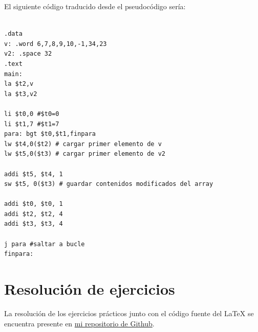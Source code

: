 \documentclass[11pt]{article}
\begin{document}
\begin{large}
\begin{flushleft}
El siguiente código traducido desde el pseudocódigo sería:
\newpage

\begin{listing}[h]
\begin{verbatim}

.data
v: .word 6,7,8,9,10,-1,34,23
v2: .space 32
.text
main: 
la $t2,v
la $t3,v2

li $t0,0 #$t0=0
li $t1,7 #$t1=7
para: bgt $t0,$t1,finpara
lw $t4,0($t2) # cargar primer elemento de v
lw $t5,0($t3) # cargar primer elemento de v2

addi $t5, $t4, 1
sw $t5, 0($t3) # guardar contenidos modificados del array

addi $t0, $t0, 1
addi $t2, $t2, 4
addi $t3, $t3, 4

j para #saltar a bucle
finpara: 

\end{verbatim}
\end{listing}




\section*{Resolución de ejercicios}
La resolución de los ejercicios prácticos junto con el código fuente del LaTeX se encuentra presente en \href{https://github.com/maph420/IRC_Practicas_MIPS/tree/master/Practica_2}{mi repositorio de Github}.

\end{flushleft}
\end{large}
\end{document}

